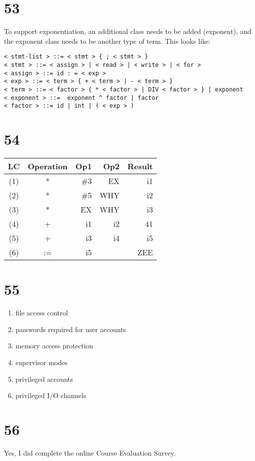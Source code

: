 \documentclass[a4paper,11pt]{article}
\begin{document}

\section*{53}

To support exponentiation, an additional class needs to be added (exponent), and the exponent class needs to be another type of term.  This looks like:

\begin{verbatim}
< stmt-list > ::= < stmt > { ; < stmt > }
< stmt > ::= < assign > | < read > | < write > | < for >
< assign > ::= id : = < exp >
< exp > ::= < term > { + < term > | - < term > }
< term > ::= < factor > { * < factor > | DIV < factor > } | exponent
< exponent > ::=  exponent ^ factor | factor
< factor > ::= id | int | ( < exp > )

\end{verbatim}


\section*{54}
\begin{tabular}{ | c | c | r | r | r |}
  \hline
    LC & Operation & Op1 & Op2 & Result  \\ \hline
    (1) & * & \#3 & EX & i1 \\ \hline
    (2) & * & \#5 & WHY & i2 \\ \hline
    (3) & * & EX & WHY & i3 \\ \hline
    (4) & + & i1 & i2 & 41 \\ \hline
    (5) & + & i3 & i4 & i5 \\ \hline
    (6) & := & i5 &  & ZEE \\ \hline
\end{tabular}



\section*{55}
\begin{enumerate}
  \item  file access control
  \item  passwords required for user accounts
  \item  memory access protection
  \item  supervisor modes
  \item  privileged accounts
  \item  privileged I/O channels
\end{enumerate}



\section*{56}
Yes, I did complete the online Course Evaluation Survey.

\end{document}
